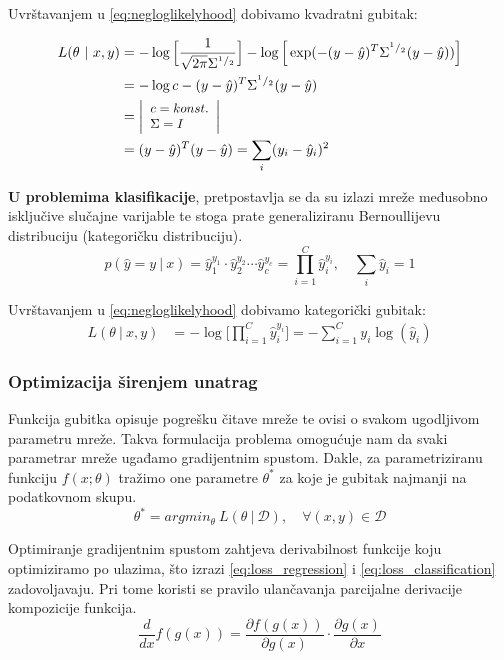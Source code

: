 \documentclass[times, utf8, diplomski]{fer}
\def\pfrac#1#2{\frac{\partial #1}{\partial #2}}
\def\dfrac#1#2{\frac{d #1}{d #2}}
\def\probsep{\ |\ }
\def\dataset{\mathcal{D}}
\begin{document}
Uvrštavanjem u \eqref{eq:negloglikelyhood} dobivamo kvadratni gubitak:

\begin{align}
\label{eq:loss_regression}
L(\theta \probsep x,y) &= - \log \Big[ \frac{1}{\sqrt{2\pi}\Sigma^{^1/_2}} \Big] - \log \Big[ \exp(-(y-\hat{y})^T\Sigma^{^1/_2}(y-\hat{y})) \Big] \nonumber \\
&= -\log c - (y-\hat{y})^T\Sigma^{^1/_2}(y-\hat{y}) \nonumber \\
&= \left|\footnotesize 
\begin{array}[c]{l} 
	c = konst. \\ 
	\Sigma = I 
\end{array}
\right| \nonumber \\
&= (y-\hat{y})^T(y-\hat{y}) = \sum_i (y_i - \hat{y}_i)^2
\end{align}

\textbf{U problemima klasifikacije}, pretpostavlja se da su izlazi mreže međusobno isključive slučajne varijable te stoga prate generaliziranu Bernoullijevu distribuciju (kategoričku distribuciju).
\begin{equation}
p(\hat{y}=y \probsep x) = \hat{y}_1^{y_1} \cdot \hat{y}_2^{y_2} \cdots \hat{y}_c^{y_c} 
= \prod_{i=1}^C \hat{y}_i^{y_i}, \quad \sum_i \hat{y}_i = 1
\end{equation}

Uvrštavanjem u \ref{eq:negloglikelyhood} dobivamo kategorički gubitak:
\begin{align}
\label{eq:loss_classification}
L(\theta \probsep x,y) &= - \log \Big[ \prod_{i=1}^C \hat{y}_i^{y_i} \Big] = - \sum_{i=1}^C y_i \log (\hat{y}_i)
\end{align}

\subsubsection{Optimizacija širenjem unatrag}
\label{sec:backprop}
Funkcija gubitka opisuje pogrešku čitave mreže te ovisi o svakom ugodljivom parametru mreže. Takva formulacija problema omogućuje nam da svaki parametrar mreže ugađamo gradijentnim spustom. Dakle, za parametriziranu funkciju $f(x;\theta)$ tražimo one parametre $\theta^*$ za koje je gubitak najmanji na podatkovnom skupu.
\begin{equation}
\theta^* = argmin_\theta\ L(\theta \probsep \dataset), \quad \forall (x,y) \in \dataset
\end{equation}

Optimiranje gradijentnim spustom zahtjeva derivabilnost funkcije koju optimiziramo po ulazima, što izrazi \eqref{eq:loss_regression} i \eqref{eq:loss_classification} zadovoljavaju. Pri tome koristi se pravilo ulančavanja parcijalne derivacije kompozicije funkcija.
\begin{equation}
\label{eq:partial_rule}
\dfrac{}{x} f(g(x)) = \pfrac{f(g(x))}{g(x)} \cdot \pfrac{g(x)}{x}
\end{equation}
\end{document}
